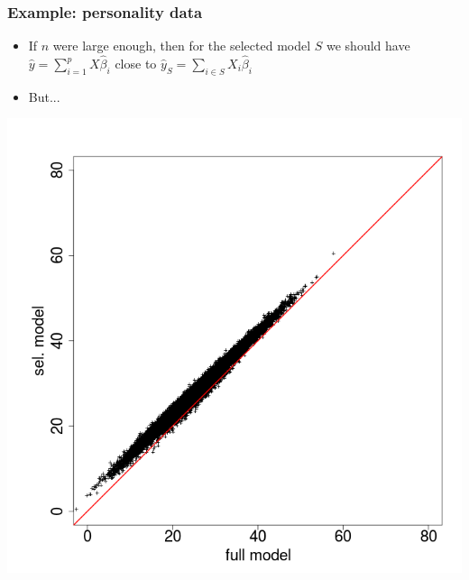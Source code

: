 \documentclass{beamer}
\begin{document}
\begin{frame}
\frametitle{Example: personality data}
\begin{itemize}
\item If $n$ were large enough, then for the selected model $S$ we
  should have $\hat{y} = \sum_{i=1}^p X\hat{\beta}_i$ close to
  $\hat{y}_S = \sum_{i \in S} X_i \hat{\beta}_i$
\item But...
\end{itemize}
\begin{center}
\includegraphics[scale = 0.2]{pf16_modelcheck.png}
\end{center}
\end{frame}
\end{document}
